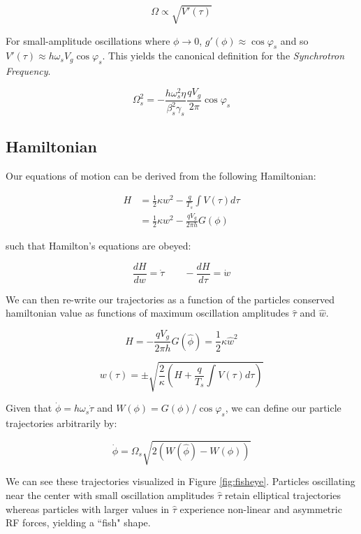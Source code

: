 $$\Omega \propto \sqrt{V'(\tau)}$$

For small-amplitude oscillations where $\phi \to 0$, $g'(\phi) \approx \cos\varphi_s$ and so $V'(\tau)\approx h\omega_s V_g \cos\varphi_s$. This yields the canonical definition for the \textit{Synchrotron Frequency}. 

\begin{equation}
    \Omega_s^2 = -\frac{h\omega_s^2\eta}{\beta_s^2\gamma_s}\frac{qV_g}{2\pi}\cos\varphi_s
    \label{eq:synchrotron_frequency}
\end{equation}

\subsection{Hamiltonian}

Our equations of motion can be derived from the following Hamiltonian:

$$\begin{aligned}
        H & = \frac{1}{2}\kappa w^2 -\frac{q}{T_s}\int V(\tau)d\tau \\
          & = \frac{1}{2}\kappa w^2 -\frac{q V_g}{2\pi h}G(\phi)
    \end{aligned}$$

such that Hamilton's equations are obeyed:

$$\frac{dH}{dw} = \dot{\tau} \qquad -\frac{dH}{d\tau} = \dot{w}$$

We can then re-write our trajectories as a function of the particles conserved hamiltonian value as functions of maximum oscillation amplitudes $\hat{\tau}$ and $\hat{w}$.

$$H = -\frac{qV_g}{2\pi h}G(\hat{\phi}) = \frac{1}{2}\kappa \hat{w}^2$$

$$w(\tau) = \pm \sqrt{\frac{2}{\kappa}\left(H+\frac{q}{T_s}\int V(\tau) d\tau\right)}$$

Given that $\dot{\phi} = h\omega_s\dot{\tau}$ and $W(\phi) = G(\phi)/\cos\varphi_s$, we can define our particle trajectories arbitrarily by:

$$\dot{\phi} = \Omega_s\sqrt{2(W(\hat{\phi})-W(\phi))}$$

We can see these trajectories visualized in Figure \ref{fig:fisheye}. Particles oscillating near the center with small oscillation amplitudes $\hat{\tau}$ retain elliptical trajectories whereas particles with larger values in $\hat{\tau}$ experience non-linear and asymmetric RF forces, yielding a ``fish" shape.

